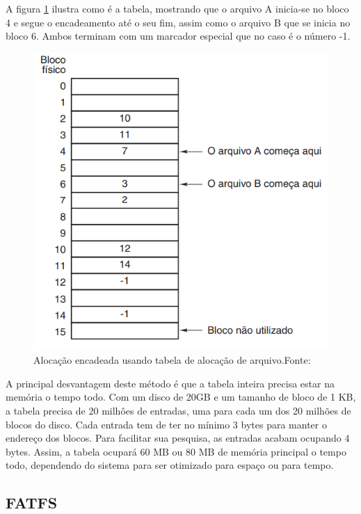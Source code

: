 A figura \ref{FAT} ilustra como é a tabela, mostrando que o arquivo A inicia-se no bloco 4 e segue o encadeamento até o seu fim, assim como o arquivo B que se inicia no bloco 6. Ambos terminam com um marcador especial que no caso é o número -1.

\begin{figure}[H]
    \scriptsize
     \centering
     \includegraphics[scale=0.7]{dados/figuras/FAT.png}
     \caption{Alocação encadeada usando tabela de alocação de arquivo.\newline  Fonte:\cite{tanenbaumSO}}
     \label{FAT}
\end{figure}

A principal desvantagem deste método é que a tabela inteira precisa estar na memória o tempo todo. Com um disco de 20GB e um tamanho de bloco de 1 KB, a tabela precisa de 20 milhôes de entradas, uma para cada um dos 20 milhões de blocos do disco. Cada entrada tem de ter no mínimo 3 bytes para manter o endereço dos blocos. Para facilitar sua pesquisa, as entradas acabam ocupando 4 bytes. Assim, a tabela ocupará 60 MB ou 80 MB de memória principal o tempo todo, dependendo do sistema para ser otimizado para espaço ou para tempo.

\subsection{FATFS}

